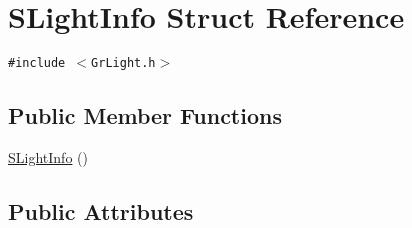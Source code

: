 \hypertarget{struct_s_light_info}{
\section{SLightInfo Struct Reference}
\label{struct_s_light_info}
}
{\tt \#include $<$GrLight.h$>$}

\subsection*{Public Member Functions}
\begin{CompactItemize}
\item 
\hyperlink{struct_s_light_info_aff77c5ffbedfdbf8ff411ceba710ce3}{SLightInfo} ()
\end{CompactItemize}
\subsection*{Public Attributes}
